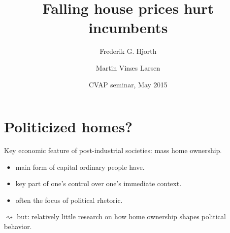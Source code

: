 \documentclass[aspectratio=169]{beamer}
\title[Power and responsibility]{Falling house prices hurt incumbents}
\author{Frederik G. Hjorth \and Martin Vinæs Larsen}
\institute[UCPH]{\large{Department of Political Science \\ University of Copenhagen}}
\date[May 2015]{CVAP seminar, May 2015}
\begin{document}
	
	\begin{frame}
		\titlepage
	\end{frame}
	
	
\section{Politicized homes?}

	\begin{frame}
	Key economic feature of post-industrial societies: mass home ownership.
	
	\vspace{0.2in} 

	\begin{itemize}
		\item main form of capital ordinary people have.
		\item key part of one's control over one's immediate context.
		\item often the focus of political rhetoric.
	\end{itemize}
	
		\vspace{0.2in} \pause
		
	$\rightsquigarrow$ but: relatively little research on how home ownership shapes political behavior.
		\end{frame}	
	
\end{document}
